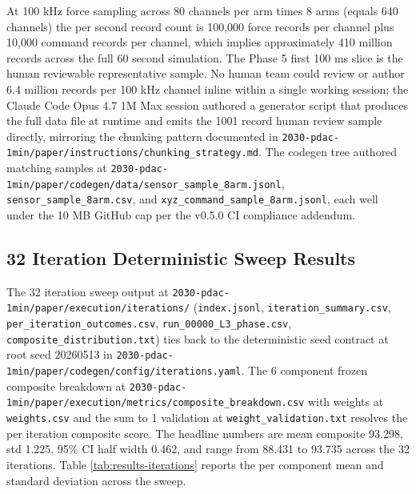 At 100 kHz force sampling across 80 channels per arm times 8 arms
(equals 640 channels) the per second record count is 100,000 force
records per channel plus 10,000 command records per channel, which
implies approximately 410 million records across the full 60
second simulation. The Phase 5 first 100 ms slice is the human
reviewable representative sample. No human team could review or
author 6.4 million records per 100 kHz channel inline within a
single working session; the Claude Code Opus 4.7 1M Max session
authored a generator script that produces the full data file at
runtime and emits the 1001 record human review sample directly,
mirroring the chunking pattern documented in
\texttt{2030-pdac-1min/paper/instructions/chunking_strategy.md}.
The codegen tree authored matching samples at
\texttt{2030-pdac-1min/paper/codegen/data/sensor_sample_8arm.jsonl},
\texttt{sensor_sample_8arm.csv}, and
\texttt{xyz_command_sample_8arm.jsonl}, each well under the 10 MB
GitHub cap per the v0.5.0 CI compliance addendum.

\subsection{32 Iteration Deterministic Sweep Results}
\label{sec:results-iterations}

The 32 iteration sweep output at
\texttt{2030-pdac-1min/paper/execution/iterations/}
(\texttt{index.jsonl}, \texttt{iteration_summary.csv},
\texttt{per_iteration_outcomes.csv}, \texttt{run_00000_L3_phase.csv},
\texttt{composite_distribution.txt}) ties back to the deterministic
seed contract at root seed 20260513 in
\texttt{2030-pdac-1min/paper/codegen/config/iterations.yaml}. The
6 component frozen composite breakdown at
\texttt{2030-pdac-1min/paper/execution/metrics/composite_breakdown.csv}
with weights at \texttt{weights.csv} and the sum to 1 validation
at \texttt{weight_validation.txt} resolves the per iteration
composite score. The headline numbers are mean composite 93.298,
std 1.225, 95\% CI half width 0.462, and range from 88.431 to
93.735 across the 32 iterations. Table
\ref{tab:results-iterations} reports the per component mean and
standard deviation across the sweep.

